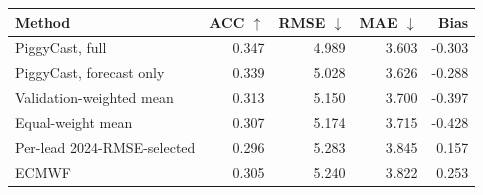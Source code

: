 \begin{tabular}{lrrrr}
\toprule
Method & ACC $\uparrow$ & RMSE $\downarrow$ & MAE $\downarrow$ & Bias \\
\midrule
PiggyCast, full & 0.347 & 4.989 & 3.603 & -0.303 \\
PiggyCast, forecast only & 0.339 & 5.028 & 3.626 & -0.288 \\
Validation-weighted mean & 0.313 & 5.150 & 3.700 & -0.397 \\
Equal-weight mean & 0.307 & 5.174 & 3.715 & -0.428 \\
Per-lead 2024-RMSE-selected & 0.296 & 5.283 & 3.845 & 0.157 \\
ECMWF & 0.305 & 5.240 & 3.822 & 0.253 \\
\bottomrule
\end{tabular}
